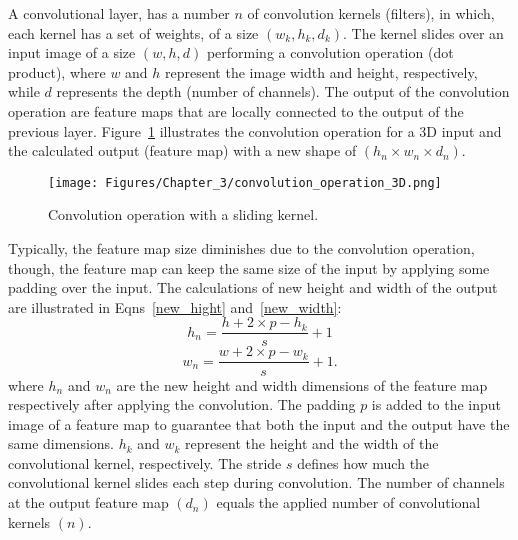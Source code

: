 A convolutional layer, has a number \( n\) of convolution kernels (filters), in  which,  each kernel has a set of weights, of a size \((w_k,h_k,d_k)\).
The kernel slides over an input image of a size \((w,h,d)\) performing a convolution operation (dot product), where \(w\) and \(h\) represent the image width and height, respectively, while \(d\) represents the depth (number of channels).
The output of the convolution operation are feature maps that are locally connected to the output of the previous layer. 
Figure~\ref{fig:convolution_3d} illustrates the convolution operation for a 3D input and the calculated output (feature map) with a new shape of \((h_{n}\times w_{n} \times d_{n})\).
\begin{figure} [!ht]
	\begin{center}
		\centering
		\texttt{[image: Figures/Chapter\_3/convolution\_operation\_3D.png]}
	\end{center}
	\caption{Convolution operation with a sliding kernel.} 
	\label{fig:convolution_3d}
\end{figure}

Typically, the feature map size diminishes due to the convolution operation, though, the feature map can keep the same size of the input by applying some padding over the input. 
The calculations of new height and width of the output are illustrated in Eqns~\ref{new_hight} and~\ref{new_width}:
\begin{equation}
	h_{n} = \frac{h+2\times p-h_{k}}{s}+1
	\label{new_hight}
\end{equation}
\begin{equation}
	w_{n} = \frac{w+2\times p-w_{k}}{s}+1.
	\label{new_width}
\end{equation} 
where \(h_{n}\) and \(w_{n}\) are the new height and width dimensions of the feature map respectively after applying the convolution. 
The padding \(p\) is added to the input image of a feature map to guarantee that both the input and the output have the same dimensions.
\(h_{k}\) and \(w_{k}\) represent the height and the width of the convolutional kernel, respectively.
The stride \(s\) defines how much the convolutional kernel slides each step during convolution.
The number of channels at the output feature map \((d_{n})\) equals the applied number of convolutional kernels \((n)\). 

